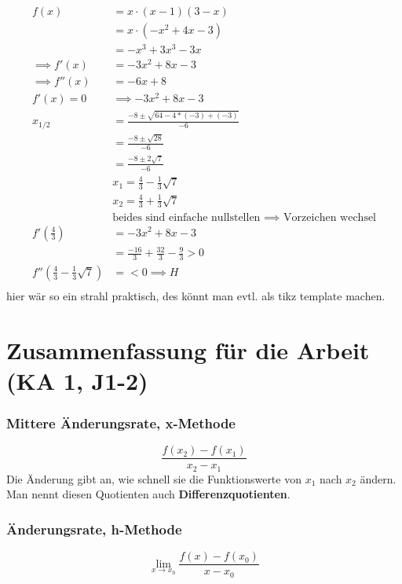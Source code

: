 \documentclass{book}
\begin{document}
\begin{align*}
f(x)&=x\cdot (x-1)(3-x)\\
&=x\cdot(-x^2+4x-3)\\
&=-x^3+3x^3-3x\\
\implies f'(x)&=-3x^2+8x-3\\
\implies f''(x)&=-6x+8\\
f'(x)=0&\implies -3x^2+8x-3\\
x_{1/2}&=\frac{-8 \pm \sqrt{64-4*(-3)+(-3)}}{-6}\\
       &=\frac{-8\pm \sqrt{28}}{-6}\\
       &=\frac{-8\pm 2\sqrt{7}}{-6}\\
       &x_1= \frac{4}{3}-\frac{1}{3}\sqrt{7}\\
       &x_2=\frac{4}{3}+ \frac{1}{3}\sqrt{7}\\
       &\text{beides sind einfache nullstellen $\implies$ Vorzeichen wechsel}\\
f'(\frac{4}{3})&=-3x^2+8x-3\\
               &=\frac{-16}{3}+\frac{32}{3}-\frac{9}{3}>0\\
f''(\frac{4}{3}-\frac{1}{3}\sqrt{7})&=<0 \implies H\\
\end{align*}
hier wär so ein strahl praktisch, des könnt man evtl. als tikz template machen.


\section{Zusammenfassung für die Arbeit (KA 1, J1-2)}
\subsubsection{Mittere Änderungsrate, x-Methode}
\[\frac{f(x_2)-f(x_1)}{x_2-x_1}\]
Die Änderung gibt an, wie schnell sie die Funktionswerte von $x_1$ nach $x_2$
ändern. Man nennt diesen Quotienten auch \textbf{Differenzquotienten}.

\subsubsection{Änderungsrate, h-Methode}
\[\lim_{x \to x_0}\frac{f(x)-f(x_0)}{x-x_0}\]

\end{document}
